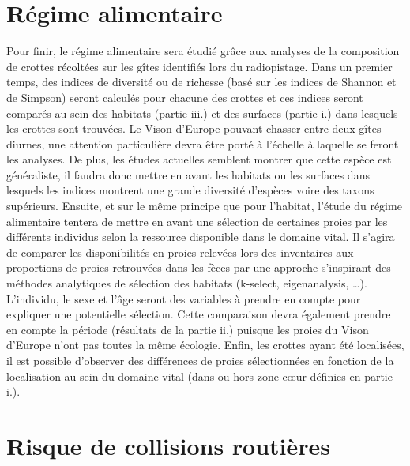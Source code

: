 \documentclass[
  letterpaper,
  DIV=11,
  numbers=noendperiod]{scrreprt}
\begin{document}
\section{Régime alimentaire}\label{ruxe9gime-alimentaire}

Pour finir, le régime alimentaire sera étudié grâce aux analyses de la
composition de crottes récoltées sur les gîtes identifiés lors du
radiopistage. Dans un premier temps, des indices de diversité ou de
richesse (basé sur les indices de Shannon et de Simpson) seront calculés
pour chacune des crottes et ces indices seront comparés au sein des
habitats (partie iii.) et des surfaces (partie i.) dans lesquels les
crottes sont trouvées. Le Vison d'Europe pouvant chasser entre deux
gîtes diurnes, une attention particulière devra être porté à l'échelle à
laquelle se feront les analyses. De plus, les études actuelles semblent
montrer que cette espèce est généraliste, il faudra donc mettre en avant
les habitats ou les surfaces dans lesquels les indices montrent une
grande diversité d'espèces voire des taxons supérieurs. Ensuite, et sur
le même principe que pour l'habitat, l'étude du régime alimentaire
tentera de mettre en avant une sélection de certaines proies par les
différents individus selon la ressource disponible dans le domaine
vital. Il s'agira de comparer les disponibilités en proies relevées lors
des inventaires aux proportions de proies retrouvées dans les fèces par
une approche s'inspirant des méthodes analytiques de sélection des
habitats (k-select, eigenanalysis, \ldots). L'individu, le sexe et l'âge
seront des variables à prendre en compte pour expliquer une potentielle
sélection. Cette comparaison devra également prendre en compte la
période (résultats de la partie ii.) puisque les proies du Vison
d'Europe n'ont pas toutes la même écologie. Enfin, les crottes ayant été
localisées, il est possible d'observer des différences de proies
sélectionnées en fonction de la localisation au sein du domaine vital
(dans ou hors zone cœur définies en partie i.).

\section{Risque de collisions
routières}\label{risque-de-collisions-routiuxe8res}
\end{document}
